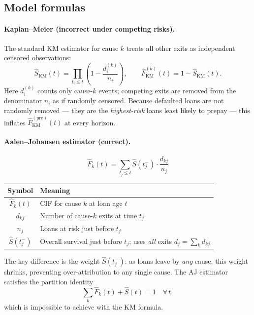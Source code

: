 \documentclass[11pt,a4paper]{article}
\begin{document}
\subsection{Model formulas}

\paragraph{Kaplan--Meier (incorrect under competing risks).}
The standard KM estimator for cause $k$ treats all other exits as
independent censored observations:
\begin{equation}
  \hat{S}_{\mathrm{KM}}(t) = \prod_{t_i \le t}\!\left(1 -
    \frac{d_i^{(k)}}{n_i}\right), \qquad
  \hat{F}_{\mathrm{KM}}^{(k)}(t) = 1 - \hat{S}_{\mathrm{KM}}(t).
  \label{eq:km}
\end{equation}
Here $d_i^{(k)}$ counts only cause-$k$ events; competing exits are
removed from the denominator $n_i$ as if randomly censored.  Because
defaulted loans are not randomly removed --- they are the
\emph{highest-risk} loans least likely to prepay --- this inflates
$\hat{F}_{\mathrm{KM}}^{(\mathrm{pre})}(t)$ at every horizon.

\paragraph{Aalen--Johansen estimator (correct).}
\begin{equation}
  \boxed{\hat{F}_k(t) = \sum_{t_j \le t} \hat{S}(t_j^{-})\cdot
    \frac{d_{kj}}{n_j}}
  \label{eq:aj}
\end{equation}

\begin{center}
\small
\begin{tabular}{cl}
\toprule
\textbf{Symbol} & \textbf{Meaning} \\
\midrule
$\hat{F}_k(t)$   & CIF for cause $k$ at loan age $t$ \\
$d_{kj}$         & Number of cause-$k$ exits at time $t_j$ \\
$n_j$            & Loans at risk just before $t_j$ \\
$\hat{S}(t_j^-)$ & Overall survival just before $t_j$; uses \emph{all} exits
                   $d_j = \sum_k d_{kj}$ \\
\bottomrule
\end{tabular}
\end{center}

The key difference is the weight $\hat{S}(t_j^-)$: as loans leave by
\emph{any} cause, this weight shrinks, preventing over-attribution to
any single cause.  The AJ estimator satisfies the partition identity
\begin{equation}
  \sum_{k} \hat{F}_k(t) + \hat{S}(t) = 1 \quad \forall\, t,
  \label{eq:partition}
\end{equation}
which is impossible to achieve with the KM formula.
\end{document}
